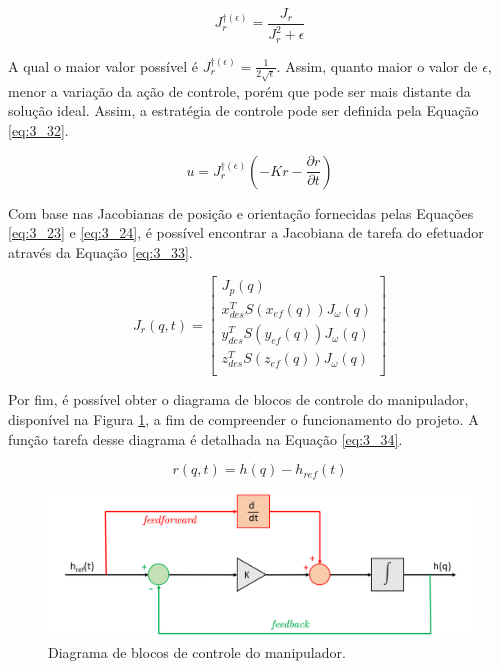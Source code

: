\begin{equation}
J_r^{\dagger (\epsilon)} = \frac{J_r}{J_r^2 + \epsilon}
\label{eq:3_31}
\end{equation}

A qual o maior valor possível é $J_r^{\dagger (\epsilon)} = \frac{1}{2 \sqrt{\epsilon}}$. Assim, quanto maior o valor de $\epsilon$, menor a variação da ação de controle, porém que pode ser mais distante da solução ideal. Assim, a estratégia de controle pode ser definida pela Equação \ref{eq:3_32}.

\begin{equation}
u = J_r^{\dagger (\epsilon)} (-Kr - \frac{\partial r}{\partial t})
\label{eq:3_32}
\end{equation}

Com base nas Jacobianas de posição e orientação fornecidas pelas Equações \ref{eq:3_23} e \ref{eq:3_24}, é possível encontrar a Jacobiana de tarefa do efetuador através da Equação \ref{eq:3_33}.

\begin{equation}
J_r(q,t) =
\begin{bmatrix}
J_p(q)\\
x_{des}^T S(x_{ef}(q)) J_{\omega}(q)\\
y_{des}^T S(y_{ef}(q)) J_{\omega}(q)\\
z_{des}^T S(z_{ef}(q)) J_{\omega}(q)\\
\end{bmatrix}
\label{eq:3_33}
\end{equation}


Por fim, é possível obter o diagrama de blocos de controle do manipulador, disponível na Figura \ref{fig:DiagramaBlocos}, a fim de compreender o funcionamento do projeto. A função tarefa desse diagrama é detalhada na Equação \ref{eq:3_34}.

\begin{equation}
r(q,t) = h(q) - h_{ref}(t)
\label{eq:3_34}
\end{equation}

\begin{figure}[h!]
\centering
\includegraphics[width=0.7\columnwidth]{Imagens/DiagramaBlocos.PNG}
\caption{Diagrama de blocos de controle do manipulador.}
\label{fig:DiagramaBlocos}
\end{figure}

